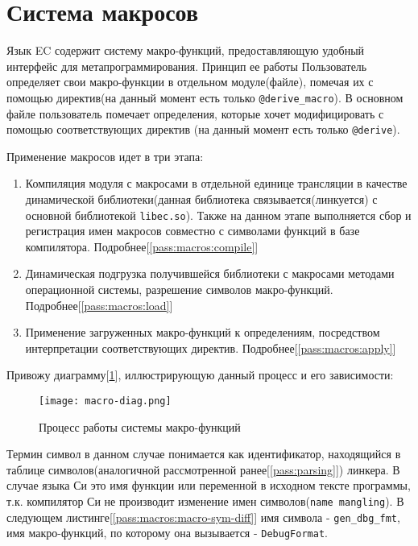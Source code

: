 \clearpage
\section{Система макросов}
\label{pass:macros}

Язык EC содержит систему макро-функций, предоставляющую удобный интерфейс для метапрограммирования.
Принцип ее работы
Пользователь определяет свои макро-функции в отдельном модуле(файле), помечая их с помощью директив(на данный момент есть только \verb|@derive_macro|).
В основном файле пользователь помечает определения, которые хочет модифицировать с помощью соответствующих директив (на данный момент есть только \verb|@derive|).

Применение макросов идет в три этапа:
\begin{enumerate}
    \item Компиляция модуля с макросами в отдельной единице трансляции в качестве динамической библиотеки(данная библиотека связывается(линкуется) с основной библиотекой \verb|libec.so|). 
        Также на данном этапе выполняется сбор и регистрация имен макросов совместно с символами функций в базе компилятора. Подробнее[\ref{pass:macros:compile}]
    \item Динамическая подгрузка получившейся библиотеки с макросами методами операционной системы, разрешение символов макро-функций.  Подробнее[\ref{pass:macros:load}]
    \item Применение загруженных макро-функций к определениям, посредством интерпретации соответствующих директив.  Подробнее[\ref{pass:macros:apply}]
\end{enumerate}

Привожу диаграмму[\ref{pass:macros:diag}], иллюстрирующую данный процесс и его зависимости:
\begin{figure}[h!]
    \texttt{[image: macro-diag.png]}
    \centering
    \caption{Процесс работы системы макро-функций}
    \label{pass:macros:diag}
\end{figure}
\FloatBarrier


Термин символ в данном случае понимается как идентификатор, находящийся в таблице символов(аналогичной рассмотренной ранее[\ref{pass:parsing}]) линкера.
В случае языка Си это имя функции или переменной в исходном тексте программы, т.к. компилятор Си не производит изменение имен символов(\verb|name mangling|\cite{wiki-nm}).
В следующем листинге[\ref{pass:macros:macro-sym-diff}] имя символа - \verb|gen_dbg_fmt|, имя макро-функций, по которому она вызывается - \verb|DebugFormat|.


